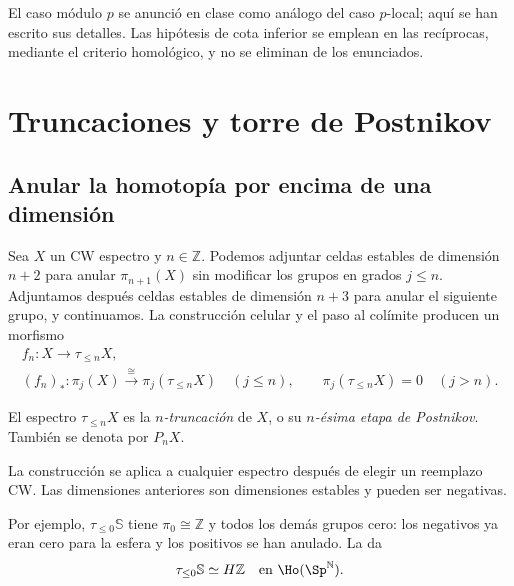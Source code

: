 El caso módulo $p$ se anunció en clase como análogo del caso $p$-local; aquí se han escrito sus detalles. Las hipótesis de cota inferior se emplean en las recíprocas, mediante el criterio homológico, y no se eliminan de los enunciados.

\section{Truncaciones y torre de Postnikov}

\subsection{Anular la homotopía por encima de una dimensión}
Sea $X$ un CW espectro y $n\in\mathbb Z$. Podemos adjuntar celdas estables de dimensión $n+2$ para anular $\pi_{n+1}(X)$ sin modificar los grupos en grados $j\leq n$. Adjuntamos después celdas estables de dimensión $n+3$ para anular el siguiente grupo, y continuamos. La construcción celular y el paso al colímite producen un morfismo
\[
\begin{gathered}
f_n\colon X\longrightarrow\tau_{\leq n}X,\\[4pt]
(f_n)_*\colon\pi_j(X)\xrightarrow{\cong}\pi_j(\tau_{\leq n}X)
\quad(j\leq n),
\qquad
\pi_j(\tau_{\leq n}X)=0\quad(j>n).
\end{gathered}
\]

\begin{defi}
El espectro $\tau_{\leq n}X$ es la \emph{$n$-truncación} de $X$, o su \emph{$n$-ésima etapa de Postnikov}. También se denota por $P_nX$.
\end{defi}
La construcción se aplica a cualquier espectro después de elegir un reemplazo CW. Las dimensiones anteriores son dimensiones estables y pueden ser negativas.

Por ejemplo, $\tau_{\leq0}\mathbb S$ tiene $\pi_0\cong\mathbb Z$ y todos los demás grupos cero: los negativos ya eran cero para la esfera y los positivos se han anulado. La  da
\[
\tau_{\leq0}\mathbb S\simeq H\mathbb Z
\quad\text{en }\Ho(\Sp^{\mathbb N}).
\]

